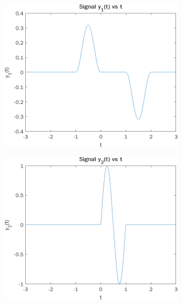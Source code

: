 \documentclass[12pt]{article}
\begin{document}
\begin{figure}[h]
\centering
\begin{subfigure}{.5\textwidth}
  \centering
  \includegraphics[width=.9\linewidth]{4d1}
\end{subfigure}%
\begin{subfigure}{.5\textwidth}
  \centering
  \includegraphics[width=.9\linewidth]{4d2}
\end{subfigure}
\end{figure}
\end{document}
